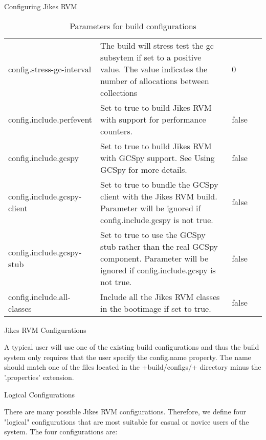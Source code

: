 \begin{chapter}{Configuring Jikes RVM}
\begin{table}
\begin{tabular}{p{0.25\linewidth}p{0.6\linewidth}p{0.15\linewidth}}
config.stress-gc-interval & The build will stress test the gc subsytem if set to a positive value. The value indicates the number of allocations between collections & 0 \\
config.include.\newline perfevent & Set to true to build Jikes RVM with support for performance counters. & false \\
config.include.gcspy & Set to true to build Jikes RVM with GCSpy support. See Using GCSpy for more details. & false \\
config.include.gcspy-client & Set to true to bundle the GCSpy client with the Jikes RVM build. Parameter will be ignored if config.include.gcspy is not true. & false \\
config.include.gcspy-stub & Set to true to use the GCSpy stub rather than the real GCSpy component. Parameter will be ignored if config.include.gcspy is not true. & false \\
config.include.all-classes & Include all the Jikes RVM classes in the bootimage if set to true. & false \\
\end{tabular}
\caption{Parameters for build configurations}
\end{table}

\begin{section}{Jikes RVM Configurations}

A typical user will use one of the existing build configurations and thus the build system only requires that the user specify the config.name property. The name should match one of the files located in the \spverb+build/configs/+ directory minus the '.properties' extension.

\begin{subsection}{Logical Configurations}

There are many possible Jikes RVM configurations. Therefore, we define four "logical" configurations that are most suitable for casual or novice users of the system. The four configurations are:


\end{subsection}
\end{section}
\end{chapter}
